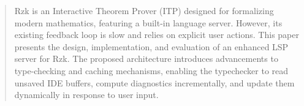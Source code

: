 \begin{abstract}

Rzk is an Interactive Theorem Prover (ITP) designed for formalizing modern mathematics,
featuring a built-in language server.
However, its existing feedback loop is slow and relies on explicit user actions.
This paper presents the design, implementation, and evaluation of an enhanced LSP server for Rzk.
The proposed architecture introduces advancements to type-checking and caching mechanisms,
enabling the typechecker to read unsaved IDE buffers, compute diagnostics incrementally,
and update them dynamically in response to user input.
\end{abstract}

